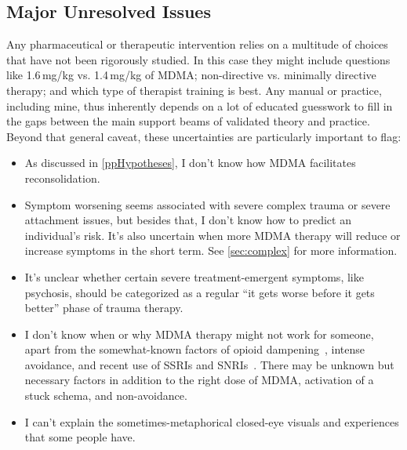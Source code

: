 \documentclass[11pt,oneside]{book}
\let\cite\parencite
\begin{document}
\subsection*{Major Unresolved Issues}
Any pharmaceutical or therapeutic intervention relies on a multitude of choices that have not been rigorously studied. In this case they might include questions like 1.6\,mg/kg vs. 1.4\,mg/kg of MDMA; non-directive vs. minimally directive therapy; and which type of therapist training is best. Any manual or practice, including mine, thus inherently depends on a lot of educated guesswork to fill in the gaps between the main support beams of validated theory and practice. Beyond that general caveat, these uncertainties are particularly important to flag:
\begin{itemize}
    \item As discussed in \cref{ppHypotheses}, I don't know how MDMA facilitates reconsolidation.
    \item Symptom worsening seems associated with severe complex trauma or severe attachment issues, but besides that, I don't know how to predict an individual's risk. It's also uncertain when more MDMA therapy will reduce or increase symptoms in the short term. See \cref{sec:complex} for more information.
    \item It's unclear whether certain severe treatment-emergent symptoms, like psychosis, should be categorized as a regular \enquote{it gets worse before it gets better} phase of trauma therapy.
    \item I don't know when or why MDMA therapy might not work for someone, apart from the somewhat-known factors of opioid dampening~\cite{razviPSIP}, intense avoidance, and recent use of SSRIs and SNRIs~\cite{feducciaSSRIDiscontinuation}. There may be unknown but necessary factors in addition to the right dose of MDMA, activation of a stuck schema, and non-avoidance.
    \item I can't explain the sometimes-metaphorical closed-eye visuals and experiences that some people have.
\end{itemize}
\end{document}
